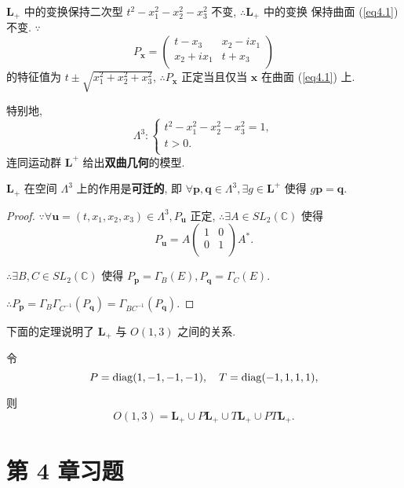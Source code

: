 \documentclass[color=black,device=normal,lang=cn,mode=geye]{elegantnote}
\begin{document}
$\boldsymbol{L}_+$ 中的变换保持二次型 $t^2-x_1^2-x_2^2-x_3^2$ 不变, $\therefore\boldsymbol{L}_+$ 中的变换 保持曲面 (\ref{eq4.1}) 不变. $\because$
\[P_{\boldsymbol{x}}=\begin{pmatrix}
    t-x_3 & x_2-ix_1 \\
    x_2+ix_1 & t+x_3 \\
\end{pmatrix}\]
的特征值为 $t\pm\sqrt{x_1^2+x_2^2+x_3^2}$, $\therefore P_{\boldsymbol{x}}$ 正定当且仅当 $\boldsymbol{x}$ 在曲面 (\ref{eq4.1}) 上.

特别地, 
\[\Lambda^3:\begin{cases}
    t^2-x_1^2-x_2^2-x_3^2=1, \\
    t>0. \\
\end{cases}\]
连同运动群 $\boldsymbol{L}^+$ 给出\textbf{双曲几何}的模型.
\begin{theorem}
    $\boldsymbol{L}_+$ 在空间 $\Lambda^3$ 上的作用是\textbf{可迁的}, 即 $\forall\boldsymbol{p},\boldsymbol{q}\in\Lambda^3,\exists g\in\boldsymbol{L}^+$ 使得 $g\boldsymbol{p}=\boldsymbol{q}$.
\end{theorem}
\begin{proof}
    $\because\forall\boldsymbol{u}=(t,x_1,x_2,x_3)\in\Lambda^3,P_{\boldsymbol{u}}$ 正定, $\therefore\exists A\in SL _2(\mathbb{C})$ 使得
    \[P_{\boldsymbol{u}}=A\begin{pmatrix}
        1 & 0 \\
        0 & 1 \\
    \end{pmatrix}A^*.\]

    $\therefore\exists B,C\in SL _2(\mathbb{C})$ 使得 $P_{\boldsymbol{p}}=\Gamma_B(E),P_{\boldsymbol{q}}=\Gamma_C(E)$.

    $\therefore P_{\boldsymbol{p}}=\Gamma_B\Gamma_{C^{-1}}(P_{\boldsymbol{q}})=\Gamma_{BC^{-1}}(P_{\boldsymbol{q}})$.
\end{proof}
下面的定理说明了 $\boldsymbol{L}_+$ 与 $O(1,3)$ 之间的关系.
\begin{theorem}
    令
    \[P=\operatorname{diag} (1,-1,-1,-1),\quad T=\operatorname{diag} (-1,1,1,1),\]

    则
    \[O(1,3)=\boldsymbol{L}_+\cup P\boldsymbol{L}_+\cup T\boldsymbol{L}_+\cup PT\boldsymbol{L}_+.\]
\end{theorem}
\section{第 4 章习题}
\end{document}
